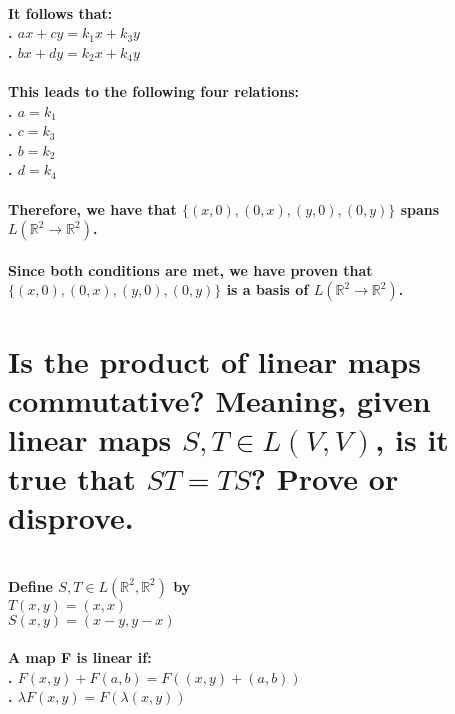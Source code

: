 \documentclass{article}
\begin{document}
\paragraph{\large
It follows that:
\\. $ax+cy = k_1 x + k_3 y$
\\. $bx+dy = k_2 x + k_4 y$}

\paragraph{\large
This leads to the following four relations:
\\. $a = k_1$
\\. $c = k_3$
\\. $b = k_2$
\\. $d = k_4$}

\paragraph{\large
Therefore, we have that $\{(x, 0), (0, x), (y, 0), (0, y)\}$ spans 
\\$L(\mathbb{R}^2 \rightarrow \mathbb{R}^2)$.}

\paragraph{\large
Since both conditions are met, we have proven that $\{(x, 0), (0, x), (y, 0), (0, y)\}$ is a basis of $L(\mathbb{R}^2 \rightarrow \mathbb{R}^2)$.}

\newpage

\section{Is the product of linear maps commutative? Meaning, given linear maps $S,T \in L(V,V)$, is it true that $ST = TS$? Prove or disprove.}

\paragraph{\large
\setlength{\parindent}{0pt}
\\Define $S,T \in L(\mathbb{R}^2, \mathbb{R}^2)$ by 
\\$T(x, y) = (x, x)$
\\$S(x, y) = (x-y, y-x)$
}

\paragraph{\large
A map F is linear if:
\\. $F(x, y) + F(a, b) = F((x, y) + (a, b))$
\\. $\lambda F(x, y) = F(\lambda (x, y))$}
\end{document}

